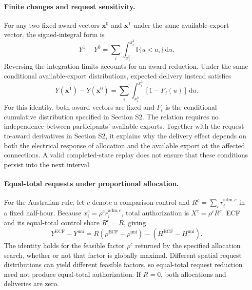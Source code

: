 \documentclass[11pt]{article}
\newcommand{\indicator}{\mathbb{I}}
\begin{document}
\paragraph{Finite changes and request sensitivity.}
For any two fixed award vectors $\mathbf x^0$ and $\mathbf x^1$ under the same
available-export vector, the signed-integral form is
\begin{equation}
Y^1-Y^0=\sum_i\int_{x_i^0}^{x_i^1}\indicator\{u<a_i\}\,\mathrm du.
\label{eq:supp_finite_delivery_change}
\end{equation}
Reversing the integration limits accounts for an award reduction. Under the
same conditional available-export distributions, expected delivery instead
satisfies
\begin{equation}
\bar Y(\mathbf x^1)-\bar Y(\mathbf x^0)
=\sum_i\int_{x_i^0}^{x_i^1}[1-F_i(u)]\,\mathrm du.
\label{eq:supp_expected_finite_delivery_change}
\end{equation}
For this identity, both award vectors are fixed and $F_i$ is the conditional
cumulative distribution specified in Section S2. The relation requires no
independence between participants' available exports. Together with the request-to-award derivatives in Section
S2, it explains why the delivery effect depends on both the electrical response
of allocation and the available export at the affected connections. A valid
completed-state replay does not ensure that these conditions persist into the
next interval.

\paragraph{Equal-total requests under proportional allocation.}
For the Australian rule, let $c$ denote a comparison control and
$R^c=\sum_i r_i^{\mathrm{adm},c}$ in a fixed half-hour.
Because $x_i^c=\rho^c r_i^{\mathrm{adm},c}$, total authorization is
$X^c=\rho^c R^c$. ECF and its equal-total control share $R^c=R$, giving
\begin{equation}
Y^{\mathrm{ECF}}-Y^{\mathrm{uni}}
=R(\rho^{\mathrm{ECF}}-\rho^{\mathrm{uni}})
-(H^{\mathrm{ECF}}-H^{\mathrm{uni}}).
\label{eq:supp_proportional_delivery_decomposition}
\end{equation}
The identity holds for the feasible factor $\rho^c$ returned by the specified
allocation search, whether or not that factor is globally maximal.
Different spatial request distributions can yield different feasible factors,
so equal-total request reduction need not produce equal-total authorization.
If $R=0$, both allocations and deliveries are zero.
\end{document}
